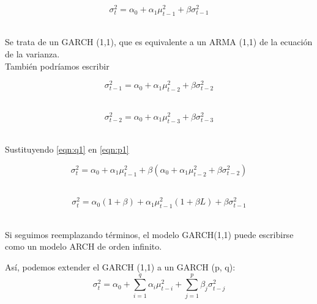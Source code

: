 	\begin{equation}\label{eqn:p1}
	\sigma_t^2 = \alpha_0 + \alpha_1 \mu^2_{t-1} + \beta \sigma_{t-1}^2
	\end{equation} 
	
	Se trata de un GARCH (1,1), que es equivalente a un ARMA (1,1) de la ecuaci\'on de la varianza.\\
	
	También podríamos escribir
	
	\begin{equation} \label{eqn:q1}
	\sigma_{t-1}^2 = \alpha_0 + \alpha_1 \mu^2_{t-2} + \beta \sigma_{t-2}^2
	\end{equation} 
	
	\begin{equation} \label{eqn:r1}
	\sigma_{t-2}^2 = \alpha_0 + \alpha_1 \mu^2_{t-3} + \beta \sigma_{t-3}^2
	\end{equation} 
	

	
	Sustituyendo \eqref{eqn:q1} en \eqref{eqn:p1}
	
	\begin{equation} \label{eqn:p}
	\sigma_t^2 = \alpha_0 + \alpha_1 \mu^2_{t-1} + \beta (\alpha_0 + \alpha_1 \mu^2_{t-2} + \beta \sigma_{t-2}^2)
	\end{equation} 
	
	\begin{equation} \label{eqn:p}
	\sigma_t^2 = \alpha_0 (1 + \beta) + \alpha_1 \mu^2_{t-1} (1 + \beta L) + \beta \sigma_{t-1}^2
	\end{equation} 
	
	Si seguimos reemplazando t\'erminos,  el modelo GARCH(1,1)  puede escribirse como un modelo ARCH de orden infinito.
	
	As\'{i}, podemos extender el GARCH (1,1) a un GARCH (p, q):
	\begin{equation}
	\sigma_{t}^{2}=\alpha_{0}+\sum_{i=1}^{q}\alpha_{i}\mu_{t-i}^{2}+\sum_{j=1}^{p}\beta_{j}\sigma_{t-j}^{2}
	\end{equation}
	

	
